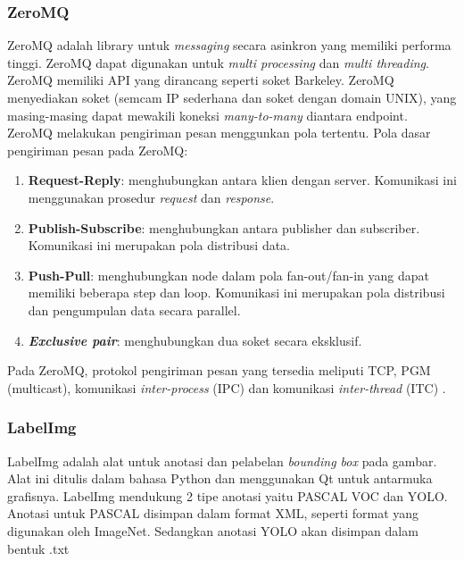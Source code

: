 \documentclass[../thesis.tex]{subfiles}
\begin{document}
\subsubsection{ZeroMQ}
ZeroMQ adalah library untuk \textit{messaging} secara asinkron yang memiliki performa tinggi. ZeroMQ dapat digunakan untuk \textit{multi processing} dan \textit{multi threading}.
ZeroMQ memiliki API yang dirancang seperti soket Barkeley.
ZeroMQ menyediakan soket (semcam IP sederhana dan soket dengan domain UNIX), yang masing-masing dapat mewakili koneksi \textit{many-to-many} diantara endpoint. ZeroMQ melakukan pengiriman pesan menggunkan pola tertentu.
Pola dasar pengiriman pesan pada ZeroMQ:
\begin{enumerate}
	\item \textbf{Request-Reply}: menghubungkan antara klien dengan server. Komunikasi ini menggunakan prosedur \textit{request} dan \textit{response}.
	\item \textbf{Publish-Subscribe}: menghubungkan antara publisher dan subscriber. Komunikasi ini merupakan pola distribusi data.
	\item \textbf{Push-Pull}: menghubungkan node dalam pola fan-out/fan-in yang dapat memiliki beberapa step dan loop. Komunikasi ini merupakan pola distribusi dan pengumpulan data secara parallel. 
	\item \textbf{\textit{Exclusive pair}}: menghubungkan dua soket secara eksklusif.
\end{enumerate}
Pada ZeroMQ, protokol pengiriman pesan yang tersedia meliputi TCP, PGM (multicast), komunikasi \textit{inter-process} (IPC) dan komunikasi \textit{inter-thread} (ITC) \cite{ZeroMQ}.

\subsubsection{LabelImg}
LabelImg adalah alat untuk anotasi dan pelabelan \textit{bounding box} pada gambar. Alat ini ditulis dalam bahasa Python dan menggunakan Qt untuk antarmuka grafisnya. LabelImg mendukung 2 tipe anotasi yaitu PASCAL VOC dan YOLO. 
Anotasi untuk PASCAL disimpan dalam format XML, seperti format yang digunakan oleh ImageNet. Sedangkan anotasi YOLO akan disimpan dalam bentuk .txt \cite{LabelImg}
\end{document}
